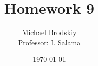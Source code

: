 


\title{Homework 9}
\date{\today}
\author{Michael Brodskiy\\ \small Professor: I. Salama}



\maketitle

